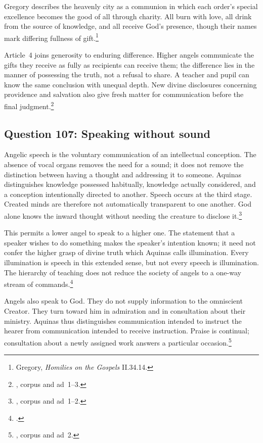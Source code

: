 Gregory describes the heavenly city as a communion in which each order's special excellence becomes the good of all through charity. All burn with love, all drink from the source of knowledge, and all receive God's presence, though their names mark differing fullness of gift.\footnote{Gregory, \emph{Homilies on the Gospels} II.34.14.}

Article~4 joins generosity to enduring difference. Higher angels communicate the gifts they receive as fully as recipients can receive them; the difference lies in the manner of possessing the truth, not a refusal to share. A teacher and pupil can know the same conclusion with unequal depth. New divine disclosures concerning providence and salvation also give fresh matter for communication before the final judgment.\footnote{, corpus and ad~1--3.}


\subsection{Question 107: Speaking without sound}\label{q107}
Angelic speech is the voluntary communication of an intellectual conception. The absence of vocal organs removes the need for a sound; it does not remove the distinction between having a thought and addressing it to someone. Aquinas distinguishes knowledge possessed habitually, knowledge actually considered, and a conception intentionally directed to another. Speech occurs at the third stage. Created minds are therefore not automatically transparent to one another. God alone knows the inward thought without needing the creature to disclose it.\footnote{, corpus and ad~1--2.}

This permits a lower angel to speak to a higher one. The statement that a speaker wishes to do something makes the speaker's intention known; it need not confer the higher grasp of divine truth which Aquinas calls illumination. Every illumination is speech in this extended sense, but not every speech is illumination. The hierarchy of teaching does not reduce the society of angels to a one-way stream of commands.\footnote{.}

Angels also speak to God. They do not supply information to the omniscient Creator. They turn toward him in admiration and in consultation about their ministry. Aquinas thus distinguishes communication intended to instruct the hearer from communication intended to receive instruction. Praise is continual; consultation about a newly assigned work answers a particular occasion.\footnote{, corpus and ad~2.}

